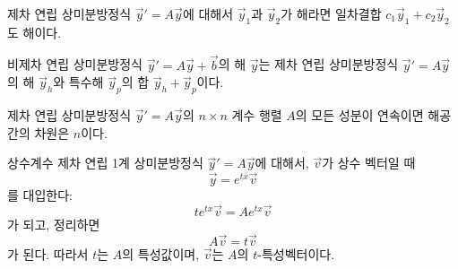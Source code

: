 \documentclass[../engineering_mathematics_lecture_note.tex]{subfiles}
\begin{document}
\begin{theorem}
    제차 연립 상미분방정식 $\vec y' = A \vec y$에 대해서 $\vec y_1$과 $\vec y_2$가 해라면 일차결합 $c_1 \vec y_1 + c_2 \vec y_2$도 해이다.
\end{theorem}

\begin{theorem}
    비제차 연립 상미분방정식 $\vec y' = A \vec y + \vec b$의 해 $\vec y$는 제차 연립 상미분방정식 $\vec y' = A \vec y$의 해 $\vec y_h$와 특수해 $\vec y_p$의 합 $\vec y_h + \vec y_p$이다.
\end{theorem}

\begin{theorem}
    제차 연립 상미분방정식 $\vec y' = A \vec y$의 $n \times n$ 계수 행렬 $A$의 모든 성분이 연속이면 해공간의 차원은 $n$이다.
\end{theorem}

\begin{example}
    상수계수 제차 연립 1계 상미분방정식 $\vec y' = A \vec y$에 대해서, $\vec v$가 상수 벡터일 때
    \begin{equation*}
        \vec y = e^{tx} \vec v
    \end{equation*}
    를 대입한다:
    \begin{equation*}
        t e^{tx} \vec v = A e^{tx} \vec v
    \end{equation*}
    가 되고, 정리하면
    \begin{equation*}
        A \vec v = t \vec v
    \end{equation*}
    가 된다.
    따라서 $t$는 $A$의 특성값이며, $\vec v$는 $A$의 $t$-특성벡터이다.
\end{example}
\end{document}
